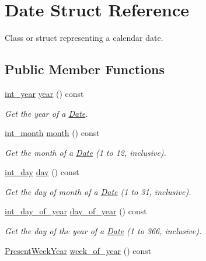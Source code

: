 \hypertarget{structDate}{\section{Date Struct Reference}
\label{structDate}
}


Class or struct representing a calendar date.  


\subsection*{Public Member Functions}
\begin{DoxyCompactItemize}
\item 
\hyperlink{types_8h_a7ff53e164374f5b24e06f3c04362e61d}{int\-\_\-year} \hyperlink{structDate_aac4f4635d8db0ea1a32c2f979a1a6cc0}{year} () const 
\begin{DoxyCompactList}\small\item\em Get the year of a \hyperlink{structDate}{Date}. \end{DoxyCompactList}\item 
\hyperlink{types_8h_a6e77e4e37237551e3c2f808f02764cec}{int\-\_\-month} \hyperlink{structDate_a39f4a9fd570f306025f78447477e42d6}{month} () const 
\begin{DoxyCompactList}\small\item\em Get the month of a \hyperlink{structDate}{Date} (1 to 12, inclusive). \end{DoxyCompactList}\item 
\hyperlink{types_8h_a2ee09cac57b5b71a2cf76051e877f320}{int\-\_\-day} \hyperlink{structDate_ac4993265144899a83ee57cd6d54d3bff}{day} () const 
\begin{DoxyCompactList}\small\item\em Get the day of month of a \hyperlink{structDate}{Date} (1 to 31, inclusive). \end{DoxyCompactList}\item 
\hyperlink{types_8h_ae73cc4736210d3120e1073d94bbac092}{int\-\_\-day\-\_\-of\-\_\-year} \hyperlink{structDate_aa1aaeb37af12be4ac07337b5e4ba8206}{day\-\_\-of\-\_\-year} () const 
\begin{DoxyCompactList}\small\item\em Get the day of the year of a \hyperlink{structDate}{Date} (1 to 366, inclusive). \end{DoxyCompactList}\item 
\hyperlink{structPresentWeekYear}{Present\-Week\-Year} \hyperlink{structDate_af051f922cdc105f86b92fc6d8bbdfa90}{week\-\_\-of\-\_\-year} () const 

\end{DoxyCompactItemize}
